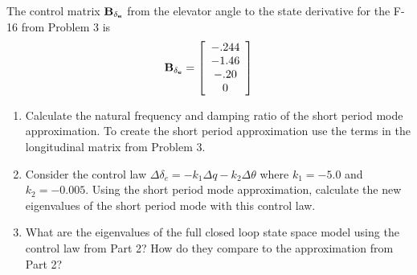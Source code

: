 \begin{question}
    The control matrix ${\bf B_{\delta_e}}$ from the elevator angle to the state derivative for the F-16 from Problem 3 is
    \begin{equation} \nonumber
    {\bf B_{\delta_e}} = 
    \left[ \begin{array}{c} 
    -.244 \\
    -1.46 \\
    -.20 \\
    0
    \end{array} \right]
    \end{equation}
    
    \begin{enumerate}[label=(\alph*)]
    \item Calculate the natural frequency and damping ratio of the short period mode approximation. To create the short period approximation use the terms in the longitudinal matrix from Problem 3.
    \item Consider the control law $\Delta \delta_e = -k_1 \Delta q - k_2 \Delta \theta$ where $k_1 = -5.0$ and $k_2 = -0.005$. Using the short period mode approximation, calculate the new eigenvalues of the short period mode with this control law.
    \item What are the eigenvalues of the full closed loop state space model using the control law from Part 2? How do they compare to the approximation from Part 2?
    \end{enumerate}
\end{question}